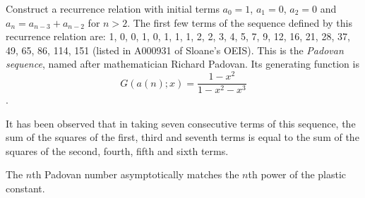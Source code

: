\documentclass[12pt]{article}
\begin{document}
Construct a recurrence relation with initial terms $a_0 = 1$, $a_1 = 0$, $a_2 = 0$ and $a_n = a_{n - 3} + a_{n - 2}$ for $n > 2$. The first few terms of the sequence defined by this recurrence relation are: 1, 0, 0, 1, 0, 1, 1, 1, 2, 2, 3, 4, 5, 7, 9, 12, 16, 21, 28, 37, 49, 65, 86, 114, 151 (listed in A000931 of Sloane's OEIS). This is the {\em Padovan sequence}, named after mathematician Richard Padovan. Its generating function is $$G(a(n); x) = \frac{1 - x^2}{1 - x^2 - x^3}$$.

It has been observed that in taking seven consecutive terms of this sequence, the sum of the squares of the first, third and seventh terms is equal to the sum of the squares of the second, fourth, fifth and sixth terms.

The $n$th Padovan number asymptotically matches the $n$th power of the plastic constant.
\end{document}
